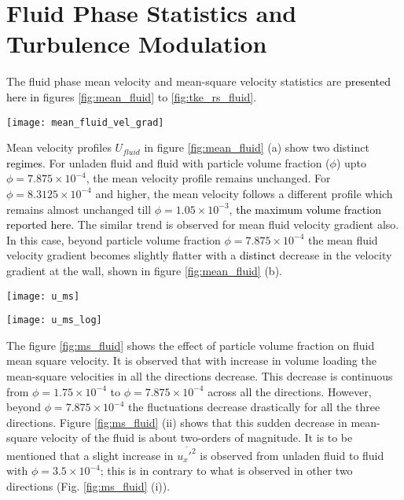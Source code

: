 \documentclass[aip,graphicx]{revtex4-1}
\begin{document}
\section{Fluid Phase Statistics and Turbulence Modulation}
	\label{sec:Fluid_phase_stats}
	The fluid phase mean velocity and mean-square velocity statistics are \textcolor{black}{presented here in} figures \ref{fig:mean_fluid} to \ref{fig:tke_rs_fluid}.
	\begin{figure*}[h!]		
		\texttt{[image: mean\_fluid\_vel\_grad]}
	    \caption{Effect of particle volume fraction on (a) mean fluid velocity $U_{fluid}$ (b) mean fluid velocity gradient $\frac{dU_{fluid}}{dy}$}  
	    \label{fig:mean_fluid}     
    \end{figure*}
    Mean velocity profiles $U_{fluid}$ in figure \ref{fig:mean_fluid} (a) show two distinct \textcolor{black}{regimes}. For unladen fluid and fluid with particle volume fraction ($\phi$) upto $\phi=7.875\times10^{-4}$, the mean velocity profile remains unchanged. For $\phi=8.3125\times10^{-4}$ and higher, the mean velocity follows a different profile which remains almost unchanged till $\phi=1.05\times10^{-3}$, \textcolor{black}{the maximum volume fraction reported here}. The similar trend is observed for mean fluid velocity gradient also. In this case, beyond particle volume fraction $\phi=7.875\times10^{-4}$ the mean fluid velocity gradient becomes slightly flatter with a \textcolor{black}{distinct} decrease in the velocity gradient at the wall, shown in figure \ref{fig:mean_fluid} (b). 
    \begin{figure*}[h!]
  	\texttt{[image: u\_ms]}
  	\caption*{(i)}
  	\texttt{[image: u\_ms\_log]}
  	\caption*{(ii)}
  	\caption{Effect of particle volume fraction on mean square fluid velocity (a) $\overline{u_x'^2}$, (b) $\overline{u_y'^2}$ and (c) $\overline{u_z'^2}$ plotted in (i) in linear scale and (ii) log-linear scale)}
  	\label{fig:ms_fluid}
    \end{figure*}
    The figure \ref{fig:ms_fluid} shows the effect of particle volume fraction on fluid mean square velocity. It is observed that with increase in volume loading the mean-square velocities in all the directions decrease. This decrease is continuous from $\phi=1.75\times10^{-4}$ to $\phi=7.875\times10^{-4}$ across all the directions. However, beyond $\phi=7.875\times10^{-4}$ the fluctuations decrease drastically for all the three directions. Figure \ref{fig:ms_fluid} (ii) shows that this sudden decrease in mean-square velocity of the fluid is about two-orders of magnitude. It is to be mentioned that a slight increase in $\overline {u_x'^2}$ is observed from unladen fluid to fluid with $\phi=3.5\times10^{-4}$;  this is in contrary to what is observed in other two directions (Fig. \ref{fig:ms_fluid} (i)).    
\end{document}
